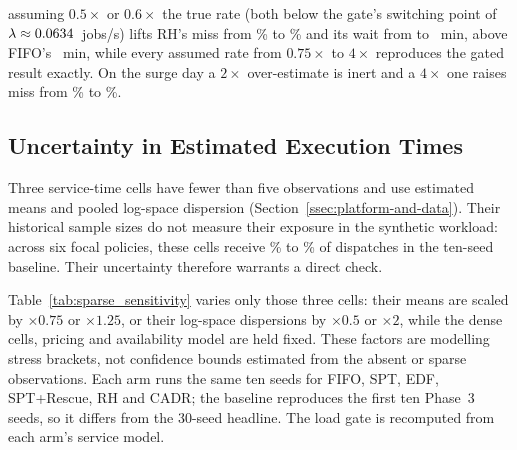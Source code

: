 {assuming $0.5\times$ or $0.6\times$ the true rate (both below the gate's switching point of $\lambda\approx0.0634$~jobs/s) lifts RH's miss from \RHMiss\% to \PriorHecUnderMiss\% and its wait from \RHWait{} to \PriorHecUnderWait~min, above FIFO's \FIFOwait~min, while every assumed rate from $0.75\times$ to $4\times$ reproduces the gated result exactly. On the surge day a $2\times$ over-estimate is inert and a $4\times$ one raises miss from \ResSurgeOnMiss\% to \ResSurgeOffMiss\%.

\subsection{Uncertainty in Estimated Execution Times}
\label{ssec:uncertainty-in-estimated-execution-times}

Three service-time cells have fewer than five observations and use estimated means and pooled log-space dispersion (Section~\ref{ssec:platform-and-data}). Their historical sample sizes do not measure their exposure in the synthetic workload: across six focal policies, these cells receive \SparseExposureLo\% to \SparseExposureHi\% of dispatches in the ten-seed baseline. Their uncertainty therefore warrants a direct check.

Table~\ref{tab:sparse_sensitivity} varies only those three cells: their means are scaled by $\times 0.75$ or $\times 1.25$, or their log-space dispersions by $\times 0.5$ or $\times 2$, while the dense cells, pricing and availability model are held fixed. These factors are modelling stress brackets, not confidence bounds estimated from the absent or sparse observations. Each arm runs the same ten seeds for FIFO, SPT, EDF, SPT+Rescue, RH and CADR; the baseline reproduces the first ten Phase~3 seeds, so it differs from the 30-seed headline. The load gate is recomputed from each arm's service model.

\begin{table}[htbp]
\centering
\caption[Estimated execution-cell sensitivity]{Deadline miss rate (\%) under estimated-cell mean and dispersion perturbations, hectic day, $C_{\max}=5$, ten paired seeds. Only the three cells with fewer than five observations are perturbed.}
\label{tab:sparse_sensitivity}
\small

\end{table}

}
